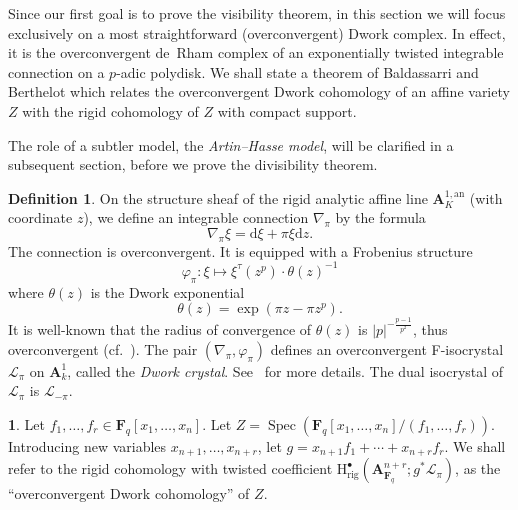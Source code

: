 \documentclass{amsart}
\numberwithin{equation}{section}
\theoremstyle{plain}
\theoremstyle{definition}
\newtheorem{situation}[equation]{}
\newtheorem{definition}[equation]{Definition}
\renewcommand{\mathbb}{\mathbf}
\begin{document}
Since our first goal is to prove the visibility theorem, in this
section we will focus exclusively on a most straightforward
(overconvergent) Dwork complex.  In effect, it is the overconvergent
de~Rham complex of an exponentially twisted integrable connection on a
\(p\)-adic polydisk.  We shall state a theorem of Baldassarri and Berthelot which relates the
overconvergent Dwork cohomology of an affine variety \(Z\) with the
rigid cohomology of \(Z\) with compact support.

The role of a subtler model, the \emph{Artin--Hasse model}, will be
clarified in a subsequent section, before we prove the divisibility
theorem.


\begin{definition}\label{definition:dwork-crystal}
On the structure sheaf of the rigid analytic affine line
\(\mathbb{A}^{1,\mathrm{an}}_K\) (with coordinate \(z\)), we define an
integrable connection \(\nabla_{\pi}\) by the formula
\begin{equation*}
\nabla_{\pi}\xi = \mathrm{d}\xi + \pi \xi \mathrm{d}z.
\end{equation*}
The connection is overconvergent.  It is equipped with a Frobenius
structure
\begin{equation*}
\varphi_{\pi}\colon \xi \mapsto \xi^{\tau}(z^p) \cdot \theta(z)^{-1}
\end{equation*}
where \(\theta(z)\) is the Dwork exponential
\begin{equation*}
\theta(z) = \exp(\pi z - \pi z^{p}).
\end{equation*}
It is well-known that the radius of convergence of \(\theta(z)\) is
\(|p|^{-\frac{p-1}{p^2}}\), thus overconvergent
(cf.~\cite[p.~396, Theorem (b)]{robert:p-adic-analysis}).
The pair \((\nabla_{\pi}, \varphi_{\pi})\) defines an overconvergent
F-isocrystal \(\mathcal{L}_{\pi}\) on \(\mathbb{A}^{1}_{k}\), called
the \emph{Dwork crystal}.  See~\cite[\S4.2.1 and
\S8.3]{le-stum:rigid-cohomology} for more details.  The dual
isocrystal of \(\mathcal{L}_{\pi}\) is \(\mathcal{L}_{-\pi}\).
\end{definition}

\begin{situation}\label{situation}%
Let \(f_{1},\ldots,f_{r} \in \mathbb{F}_{q}[x_{1},\ldots,x_{n}]\).
Let
\(Z=\operatorname{Spec}(\mathbb{F}_{q}[x_{1},\ldots,x_{n}]/(f_{1},\ldots,f_{r}))\).
Introducing new variables \(x_{n+1},\ldots,x_{n+r}\), let
\(g = x_{n+1}f_{1} + \cdots + x_{n+r}f_{r}\).  We shall refer to the
rigid cohomology with twisted coefficient
\(\mathrm{H}^{\bullet}_{\mathrm{rig}}(\mathbb{A}_{\mathbb{F}_{q}}^{n+r};g^{\ast}\mathcal{L}_{\pi})\),
as the ``overconvergent Dwork cohomology'' of \(Z\).
\end{situation}
\end{document}
